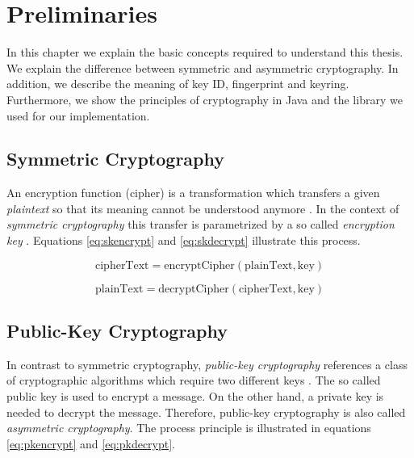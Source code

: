 \chapter{Preliminaries}
\label{chapter:pre}

In this chapter we explain the basic concepts required to understand this thesis. We explain the difference between symmetric and asymmetric cryptography. In addition, we describe the meaning of key ID, fingerprint and keyring. Furthermore, we show the principles of cryptography in Java and the library we used for our implementation.

\section{Symmetric Cryptography} \label{section:pre:symcrypto}


An encryption function (cipher) is a transformation which transfers a given \textit{plaintext} so that its meaning cannot be understood anymore \citep[section 1.4]{HAC}. In the context of \textit{symmetric cryptography} this transfer is parametrized by a so called \textit{encryption key}  \citep[section 1.5]{HAC}. Equations \ref{eq:skencrypt} and \ref{eq:skdecrypt} illustrate this process.

\begin{equation} \label{eq:skencrypt}
	\text{cipherText} = \text{encryptCipher}(\text{plainText}, \text{key})
\end{equation}

\begin{equation} \label{eq:skdecrypt}
	\text{plainText} = \text{decryptCipher}(\text{cipherText}, \text{key})
\end{equation}


\section{Public-Key Cryptography}
\label{section:pre:publiccrypto}

In contrast to  {symmetric cryptography}, \textit{public-key cryptography} references a class of cryptographic algorithms which require two different keys \citep[section 1.8]{HAC}. The so called public key is used to encrypt a message. On the other hand, a private key is needed to decrypt the message. Therefore, public-key cryptography is also called \textit{asymmetric cryptography}.  The process principle is illustrated in equations \ref{eq:pkencrypt} and \ref{eq:pkdecrypt}. 

